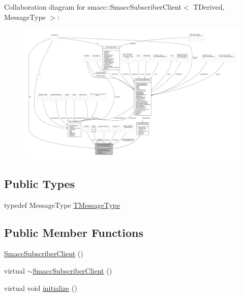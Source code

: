Collaboration diagram for smacc\+:\+:Smacc\+Subscriber\+Client$<$ T\+Derived, Message\+Type $>$\+:
\nopagebreak
\begin{figure}[H]
\begin{center}
\leavevmode
\includegraphics[width=350pt]{classsmacc_1_1SmaccSubscriberClient__coll__graph}
\end{center}
\end{figure}
\subsection*{Public Types}
\begin{DoxyCompactItemize}
\item 
typedef Message\+Type \hyperlink{classsmacc_1_1SmaccSubscriberClient_a25c1717b0a7ab42d4dc7c2a12bd3a12b}{T\+Message\+Type}
\end{DoxyCompactItemize}
\subsection*{Public Member Functions}
\begin{DoxyCompactItemize}
\item 
\hyperlink{classsmacc_1_1SmaccSubscriberClient_a39f91857807ebd5c8d8500a8f52080a0}{Smacc\+Subscriber\+Client} ()
\item 
virtual \hyperlink{classsmacc_1_1SmaccSubscriberClient_aa028dd15aaa3b2f147457b4aebc946fe}{$\sim$\+Smacc\+Subscriber\+Client} ()
\item 
virtual void \hyperlink{classsmacc_1_1SmaccSubscriberClient_afc2e5523c38250722e7197dd535599ce}{initialize} ()
\end{DoxyCompactItemize}
